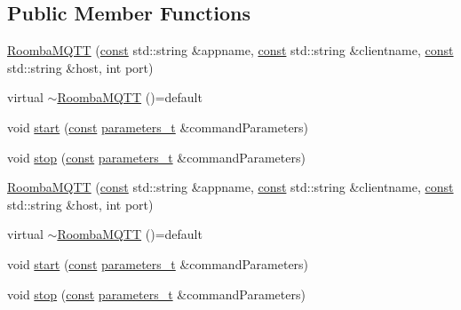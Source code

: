\subsection*{Public Member Functions}
\begin{DoxyCompactItemize}
\item 
\hyperlink{class_roomba_m_q_t_t_a20d5a60deabb9b8148a3cf0f1409dc71}{Roomba\+M\+Q\+TT} (\hyperlink{functions__c_8js_afacfd9c985d225bb07483b887a801b6f}{const} std\+::string \&appname, \hyperlink{functions__c_8js_afacfd9c985d225bb07483b887a801b6f}{const} std\+::string \&clientname, \hyperlink{functions__c_8js_afacfd9c985d225bb07483b887a801b6f}{const} std\+::string \&host, int port)
\item 
virtual \hyperlink{class_roomba_m_q_t_t_a09e4ed694fcbf4e1f158d0f4eb49683d}{$\sim$\+Roomba\+M\+Q\+TT} ()=default
\item 
void \hyperlink{class_roomba_m_q_t_t_a5ff4dbb094de2963bf4967fd5bf55b83}{start} (\hyperlink{functions__c_8js_afacfd9c985d225bb07483b887a801b6f}{const} \hyperlink{_heater_m_q_t_t_8h_ad3b3bd6544a775cf1e31cd71610c5765}{parameters\+\_\+t} \&command\+Parameters)
\item 
void \hyperlink{class_roomba_m_q_t_t_ac0a3f9c36b0865eb3e61e68ad0ef2115}{stop} (\hyperlink{functions__c_8js_afacfd9c985d225bb07483b887a801b6f}{const} \hyperlink{_heater_m_q_t_t_8h_ad3b3bd6544a775cf1e31cd71610c5765}{parameters\+\_\+t} \&command\+Parameters)
\item 
\hyperlink{class_roomba_m_q_t_t_a20d5a60deabb9b8148a3cf0f1409dc71}{Roomba\+M\+Q\+TT} (\hyperlink{functions__c_8js_afacfd9c985d225bb07483b887a801b6f}{const} std\+::string \&appname, \hyperlink{functions__c_8js_afacfd9c985d225bb07483b887a801b6f}{const} std\+::string \&clientname, \hyperlink{functions__c_8js_afacfd9c985d225bb07483b887a801b6f}{const} std\+::string \&host, int port)
\item 
virtual \hyperlink{class_roomba_m_q_t_t_a09e4ed694fcbf4e1f158d0f4eb49683d}{$\sim$\+Roomba\+M\+Q\+TT} ()=default
\item 
void \hyperlink{class_roomba_m_q_t_t_a5ff4dbb094de2963bf4967fd5bf55b83}{start} (\hyperlink{functions__c_8js_afacfd9c985d225bb07483b887a801b6f}{const} \hyperlink{_heater_m_q_t_t_8h_ad3b3bd6544a775cf1e31cd71610c5765}{parameters\+\_\+t} \&command\+Parameters)
\item 
void \hyperlink{class_roomba_m_q_t_t_ac0a3f9c36b0865eb3e61e68ad0ef2115}{stop} (\hyperlink{functions__c_8js_afacfd9c985d225bb07483b887a801b6f}{const} \hyperlink{_heater_m_q_t_t_8h_ad3b3bd6544a775cf1e31cd71610c5765}{parameters\+\_\+t} \&command\+Parameters)

\end{DoxyCompactItemize}
